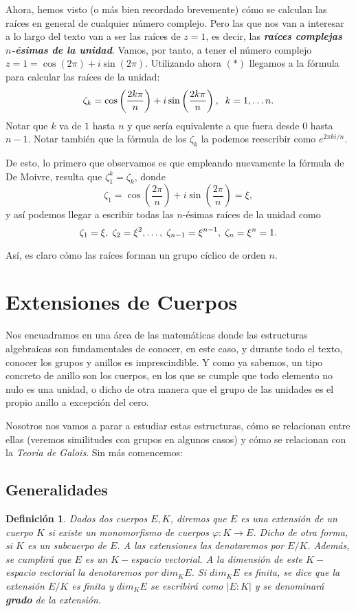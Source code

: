\documentclass[12pt]{article}
\newtheorem{definition}[theorem]{Definición}
\begin{document}
Ahora, hemos visto (o más bien recordado brevemente) cómo se calculan las raíces en general de cualquier número complejo. Pero las que nos van a interesar a lo largo del texto van a ser las raíces de $z = 1$, es decir, las \textbf{\textit{raíces complejas $n$-ésimas de la unidad}}. Vamos, por tanto, a tener el número complejo $z = 1 = \cos(2\pi) + i \sin (2\pi)$. Utilizando ahora $(\ast)$ llegamos a la fórmula para calcular las raíces de la unidad: $$\zeta_{k} = \cos \left( \dfrac{2k\pi}{n} \right) + i\sin \left( \dfrac{2k\pi}{n} \right), \hspace{0.2cm} k = 1, \ldots n.$$
Notar que $k$ va de $1$ hasta $n$ y que sería equivalente a que fuera desde $0$ hasta $n-1$. Notar también que la fórmula de los $\zeta_{k}$ la podemos reescribir como $e^{2\pi k i/n}$.

De esto, lo primero que observamos es que empleando nuevamente la fórmula de De Moivre, resulta que $\zeta_{1}^{k} = \zeta_{k}$, donde $$\zeta_{1} =  \cos \left( \dfrac{2\pi}{n} \right) + i\sin \left( \dfrac{2\pi}{n} \right) = \xi,$$ y así podemos llegar a escribir todas las $n$-ésimas raíces de la unidad como $$\zeta_{1} = \xi, \hspace{0.1cm} \zeta_{2} = \xi^{2}, \ldots, \hspace{0.1cm} \zeta_{n-1} = \xi^{n-1}, \hspace{0.1cm}\zeta_{n} = \xi^{n} = 1.$$

Así, es claro cómo las raíces forman un grupo cíclico de orden $n$.
\section{Extensiones de Cuerpos}
Nos encuadramos en una área de las matemáticas donde las estructuras algebraicas son fundamentales de conocer, en este caso, y durante todo el texto, conocer los grupos y anillos es imprescindible. Y como ya sabemos, un tipo concreto de anillo son los cuerpos, en los que se cumple que todo elemento no nulo es una unidad, o dicho de otra manera que el grupo de las unidades es el propio anillo a excepción del cero. 

Nosotros nos vamos a parar a estudiar estas estructuras, cómo se relacionan entre ellas (veremos similitudes con grupos en algunos casos) y cómo se relacionan con la \textit{Teoría de Galois}. Sin más comencemos:
\subsection{Generalidades}
\begin{definition} Dados dos cuerpos $E,K$, diremos que $E$ es una extensión de un cuerpo $K$ si existe un monomorfismo de cuerpos $\varphi \colon K \longrightarrow E$. Dicho de otra forma, si $K$ es un subcuerpo de $E$. A las extensiones las denotaremos por $E/K$.
Además, se cumplirá que $E$ es un $K-$espacio vectorial. A la dimensión de este $K-$espacio vectorial la denotaremos por $dim_{K}E$. Si $dim_{K}E$ es finita, se dice que la extensión $E/K$ es finita y $dim_{K}E$ se escribirá como $| E : K|$ y se denominará \textbf{grado} de la extensión.
\end{definition}
\end{document}
